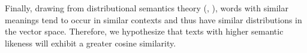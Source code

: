 Finally, drawing from distributional semantics theory (\cite{firth1957linguistics}, \cite{sahlgren2008distributional}), words with similar meanings tend to occur in similar contexts and thus have similar distributions in the vector space. Therefore, we hypothesize that texts with higher semantic likeness will exhibit a greater cosine similarity. 




%
%
%
%
